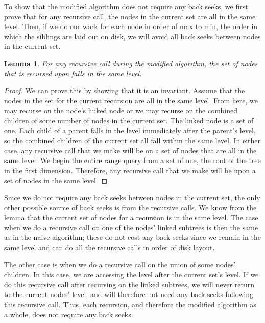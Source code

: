 \documentclass[11pt, oneside]{article}
\newtheorem*{lemma}{Lemma}
\begin{document}
To show that the modified algorithm does not require any back seeks, we first
prove that for any recursive call, the nodes in the current set are all in the
same level. Then, if we do our work for each node in order of max to min, the
order in which the siblings are laid out on disk, we will avoid all back seeks
between nodes in the current set. \\

\begin{lemma}
    For any recursive call during the modified algorithm, the set of nodes that
    is recursed upon falls in the same level. 
\end{lemma}
\begin{proof}
    We can prove this by showing that it is an invariant. Assume that the nodes
    in the set for the current recursion are all in the same level. From here,
    we may recurse on the node's linked node or we may recurse on the combined
    children of some number of nodes in the current set. The linked node is a
    set of one. Each child of a parent falls in the level immediately after the
    parent's level, so the combined children of the current set all fall within
    the same level. In either case, any recursive call that we make will be on
    a set of nodes that are all in the same level. We begin the entire range
    query from a set of one, the root of the tree in the first dimension.
    Therefore, any recursive call that we make will be upon a set of nodes in
    the same level. 
\end{proof}

Since we do not require any back seeks between nodes in the current set, the
only other possible source of back seeks is from the recursive calls. We know
from the lemma that the current set of nodes for a recursion is in the same
level. The case when we do a recursive call on one of the nodes' linked
subtrees is then the same as in the naive algorithm; these do not cost any back
seeks since we remain in the same level and can do all the recursive calls in
order of disk layout. 

The other case is when we do a recursive call on the union of some nodes'
children. In this case, we are accessing the level after the current set's
level. If we do this recursive call after recursing on the linked subtrees, we
will never return to the current nodes' level, and will therefore not need any
back seeks following this recursive call. Thus, each recursion, and therefore
the modified algorithm as a whole, does not require any back seeks.
\end{document}
